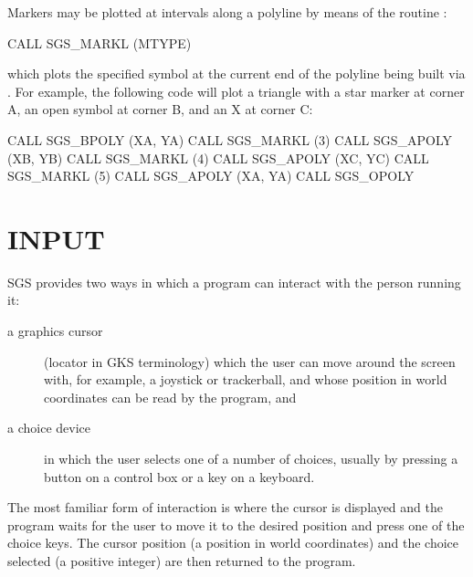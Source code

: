 \documentclass[11pt]{starlink}
\begin{document}
Markers may be plotted at intervals along a polyline by means of the
routine :
\begin{terminalv}
CALL SGS_MARKL (MTYPE)
\end{terminalv}
which plots the specified symbol at the current end of the polyline
being built via .
For example, the following code will
plot a triangle with a star marker at corner A,
an open symbol at corner B, and an X at corner C:
\begin{terminalv}
CALL SGS_BPOLY (XA, YA)
CALL SGS_MARKL (3)
CALL SGS_APOLY (XB, YB)
CALL SGS_MARKL (4)
CALL SGS_APOLY (XC, YC)
CALL SGS_MARKL (5)
CALL SGS_APOLY (XA, YA)
CALL SGS_OPOLY
\end{terminalv}

\section {INPUT}

SGS provides two ways in which a program can interact with the person running
it:
\begin{description}
\item[a graphics cursor] (locator in GKS terminology) which
the user can move
around the screen with,
for example, a joystick or trackerball, and whose
position in world coordinates can be read by the program, and
\item[a choice device] in which the user
selects one of a number of choices, usually by pressing
a button on a control
box or a key on a keyboard.
\end{description}
The most familiar form of interaction is where the cursor is displayed and the
program waits for the user to move it to the desired position and press one
of the choice keys.  The cursor position (a position in world coordinates) and
the choice selected (a positive integer) are then returned to the program.
\end{document}
